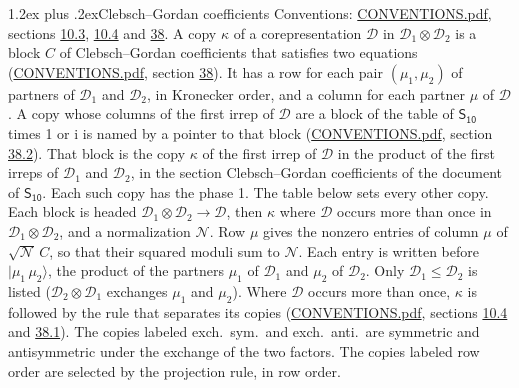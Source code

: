 \documentclass[10pt,a4paper]{article}
\makeatletter
\renewcommand\section{\@startsection{section}{1}{\z@}{-3ex plus -1ex minus -.2ex}%
  {1.2ex plus .2ex}{\normalfont\large\sffamily\bfseries\color{parttitle}}}
\numberwithin{equation}{section}
\newcommand{\grp}[1]{\mathsf{#1}}
\newcommand{\iunit}{\mathrm{i}}
\newcommand{\irrprod}{\otimes}
\newcommand{\mult}{\kappa}
\newcommand{\intx}{\mu}
\newcommand{\cgnorm}{\mathcal{N}}
\newcommand{\prodket}[2]{\lvert {#1}\,{#2}\rangle}
\makeatother
\begin{document}
\section{Clebsch--Gordan coefficients}\label{s:clebsch_gordan}
Conventions: \href{../../CONVENTIONS.pdf}{CONVENTIONS.pdf}, sections \href{../../../rotation/CONVENTIONS.pdf\#conv.10.3}{10.3}, \href{../../../rotation/CONVENTIONS.pdf\#conv.10.4}{10.4} and \href{../../CONVENTIONS.pdf\#conv.38}{38}.
\leavevmode\label{n:index.copy}\label{n:matrix.cg.stored}A copy $\mult$ of a corepresentation $\mathcal{D}$ in $\mathcal{D}_1\irrprod\mathcal{D}_2$ is a block $C$ of Clebsch--Gordan coefficients that satisfies two equations (\href{../../CONVENTIONS.pdf}{CONVENTIONS.pdf}, section \href{../../CONVENTIONS.pdf\#conv.38}{38}). \label{n:index.cg}It has a row for each pair $(\intx_1, \intx_2)$ of partners of $\mathcal{D}_1$ and $\mathcal{D}_2$, in Kronecker order, and a column for each partner $\intx$ of $\mathcal{D}$.
A copy whose columns of the first irrep of $\mathcal{D}$ are a block of the table of $\grp{S_{10}}$ times 1 or $\iunit$ is named by a pointer to that block (\href{../../CONVENTIONS.pdf}{CONVENTIONS.pdf}, section \href{../../CONVENTIONS.pdf\#conv.38.2}{38.2}). That block is the copy $\mult$ of the first irrep of $\mathcal{D}$ in the product of the first irreps of $\mathcal{D}_1$ and $\mathcal{D}_2$, in the section Clebsch--Gordan coefficients of the document of \href{../../../rotation/data/pdf/S10.pdf}{$\grp{S_{10}}$}. Each such copy has the phase 1. The table below sets every other copy.
Each block is headed $\mathcal{D}_1\irrprod\mathcal{D}_2\to\mathcal{D}$, then $\mult$ where $\mathcal{D}$ occurs more than once in $\mathcal{D}_1\irrprod\mathcal{D}_2$, and a normalization $\cgnorm$. Row $\intx$ gives the nonzero entries of column $\intx$ of $\sqrt{\cgnorm}\,C$, so that their squared moduli sum to $\cgnorm$. \label{n:vector.ket.product}Each entry is written before $\prodket{\intx_1}{\intx_2}$, the product of the partners $\intx_1$ of $\mathcal{D}_1$ and $\intx_2$ of $\mathcal{D}_2$. Only $\mathcal{D}_1 \le \mathcal{D}_2$ is listed ($\mathcal{D}_2\irrprod\mathcal{D}_1$ exchanges $\intx_1$ and $\intx_2$).
Where $\mathcal{D}$ occurs more than once, $\mult$ is followed by the rule that separates its copies (\href{../../CONVENTIONS.pdf}{CONVENTIONS.pdf}, sections \href{../../../rotation/CONVENTIONS.pdf\#conv.10.4}{10.4} and \href{../../CONVENTIONS.pdf\#conv.38.1}{38.1}). \label{n:abbreviation.exchange}The copies labeled exch.\ sym.\ and exch.\ anti.\ are symmetric and antisymmetric under the exchange of the two factors. The copies labeled row order are selected by the projection rule, in row order.
\end{document}
